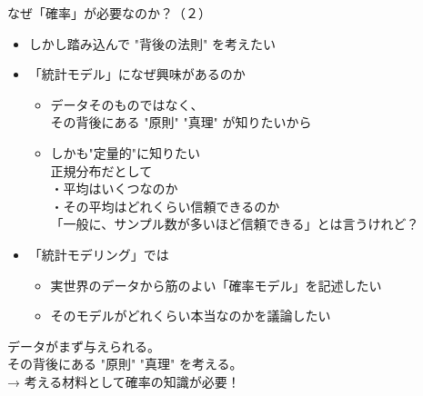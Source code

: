 \documentclass[dvipdfmx,cjk,handout]{beamer}
\begin{document}
\begin{frame}{なぜ「確率」が必要なのか？（２）}


\begin{itemize}

    \item しかし踏み込んで "背後の法則" を考えたい \pause

    \item 「統計モデル」になぜ興味があるのか\pause
        \begin{itemize}
        \item データそのものではなく、\\その背後にある "原則" "真理" が知りたいから\\\pause
        \item しかも"定量的"に知りたい\\ \pause
        正規分布だとして \\ \pause
        ・平均はいくつなのか \\ \pause
        ・その平均はどれくらい信頼できるのか \\ \pause
        「一般に、サンプル数が多いほど信頼できる」とは言うけれど？
        \end{itemize}
        
    \pause
    \item 「統計モデリング」では \pause
    \pause
        \begin{itemize}
        \item 実世界のデータから筋のよい「確率モデル」を記述したい
        \item そのモデルがどれくらい本当なのかを議論したい
        \end{itemize}

    \pause

\end{itemize}

\vskip 0.3cm

データがまず与えられる。\\ \pause
その背後にある "原則" "真理" を考える。\\ \pause
→ 考える材料として確率の知識が必要！

\end{frame}
\end{document}
